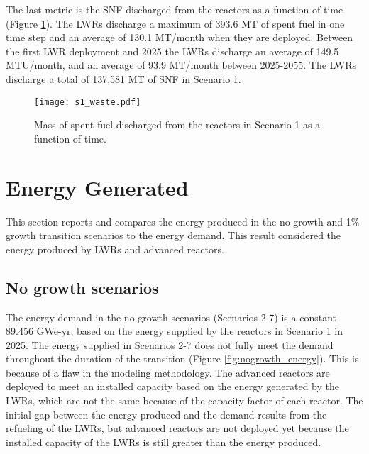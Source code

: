 The last metric is the \gls{SNF} discharged from the reactors as a function of
time (Figure \ref{fig:waste1}). The \glspl{LWR} discharge a maximum of 393.6 MT 
of spent fuel in one time step and an average of 130.1 MT/month when they are 
deployed. Between the first \gls{LWR} deployment and 2025 the \glspl{LWR} 
discharge an average of 149.5 MTU/month, and an average of 93.9 MT/month  
between 2025-2055. The \glspl{LWR} discharge a total of 137,581 MT of \gls{SNF} 
in Scenario 1. 

\begin{figure}
    \centering
    \texttt{[image: s1\_waste.pdf]}
    \caption{Mass of spent fuel discharged from the reactors in Scenario 1 as a function of time.}
    \label{fig:waste1}
\end{figure}

\section{Energy Generated} \label{sec:energy}
This section reports and compares the energy produced in the no growth and 
1\% growth transition scenarios to the energy demand. This result 
considered the energy produced by \glspl{LWR} and advanced reactors. 

\subsection{No growth scenarios}
The energy demand in the no growth scenarios (Scenarios 2-7) is a constant
89.456 GWe-yr, based on the energy supplied by the reactors in Scenario 1
in 2025. The energy supplied in Scenarios 2-7 does not fully meet the demand
throughout the duration of the transition (Figure \ref{fig:nogrowth_energy}). 
This is because of a flaw in the modeling methodology. The advanced reactors 
are deployed to meet an installed capacity based on the energy generated by 
the \glspl{LWR}, which are not the same because of the capacity factor of 
each reactor. The initial gap between the energy produced and the demand results 
from the refueling of the \glspl{LWR}, but advanced reactors are not deployed 
yet because the installed capacity of the \glspl{LWR} is still greater than 
the energy produced. 

